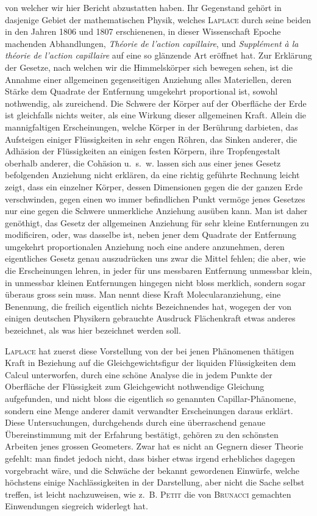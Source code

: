 \documentclass[11pt,a4paper]{article}
\begin{document}
\smallskip
von welcher wir hier Bericht abzustatten haben. Ihr Gegenstand gehört in dasjenige Gebiet der mathematischen Physik, welches \textsc{Laplace} durch seine beiden in den Jahren 1806 und 1807 erschienenen, in dieser Wissenschaft Epoche machenden Abhandlungen, \textit{Théorie de l'action capillaire}, und \textit{Supplément à la théorie de l'action capillaire} auf eine so glänzende Art eröffnet hat. Zur Erklärung der Gesetze, nach welchen wir die Himmelskörper sich bewegen sehen, ist die Annahme einer allgemeinen gegenseitigen Anziehung alles Materiellen, deren Stärke dem Quadrate der Entfernung umgekehrt proportional ist, sowohl nothwendig, als zureichend. Die Schwere der Körper auf der Oberfläche der Erde ist gleichfalls nichts weiter, als eine Wirkung dieser allgemeinen Kraft. Allein die mannigfaltigen Erscheinungen, welche Körper in der Berührung darbieten, das Aufsteigen einiger Flüssigkeiten in sehr engen Röhren, das Sinken anderer, die Adhäsion der Flüssigkeiten an einigen festen Körpern, ihre Tropfengestalt oberhalb anderer, die Cohäsion u.~s.~w. lassen sich aus einer jenes Gesetz befolgenden Anziehung nicht erklären, da eine richtig geführte Rechnung leicht zeigt, dass ein einzelner Körper, dessen Dimensionen gegen die der ganzen Erde verschwinden, gegen einen wo immer befindlichen Punkt vermöge jenes Gesetzes nur eine gegen die Schwere unmerkliche Anziehung ausüben kann. Man ist daher genöthigt, das Gesetz der allgemeinen Anziehung für sehr kleine Entfernungen zu modificiren, oder, was dasselbe ist, neben jener dem Quadrate der Entfernung umgekehrt proportionalen Anziehung noch eine andere anzunehmen, deren eigentliches Gesetz genau auszudrücken uns zwar die Mittel fehlen; die aber, wie die Erscheinungen lehren, in jeder für uns messbaren Entfernung unmessbar klein, in unmessbar kleinen Entfernungen hingegen nicht bloss merklich, sondern sogar überaus gross sein muss. Man nennt diese Kraft Molecularanziehung, eine Benennung, die freilich eigentlich nichts Bezeichnendes hat, wogegen der von einigen deutschen Physikern gebrauchte Ausdruck Flächenkraft etwas anderes bezeichnet, als was hier bezeichnet werden soll.

\textsc{Laplace} hat zuerst diese Vorstellung von der bei jenen Phänomenen thätigen Kraft in Beziehung auf die Gleichgewichtsfigur der liquiden Flüssigkeiten dem Calcul unterworfen, durch eine schöne Analyse die in jedem Punkte der Oberfläche der Flüssigkeit zum Gleichgewicht nothwendige Gleichung aufgefunden, und nicht bloss die eigentlich so genannten Capillar-Phänomene, sondern eine Menge anderer damit verwandter Erscheinungen daraus erklärt. Diese Untersuchungen, durchgehends durch eine überraschend genaue Übereinstimmung mit der Erfahrung bestätigt, gehören zu den schönsten Arbeiten jenes grossen Geometers. Zwar hat es nicht an Gegnern dieser Theorie gefehlt: man findet jedoch nicht, dass bisher etwas irgend erhebliches dagegen vorgebracht wäre, und die Schwäche der bekannt gewordenen Einwürfe, welche höchstens einige Nachlässigkeiten in der Darstellung, aber nicht die Sache selbst treffen, ist leicht nachzuweisen, wie z.~B. \textsc{Petit} die von \textsc{Brunacci} gemachten Einwendungen siegreich widerlegt hat.
\end{document}
